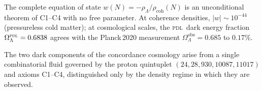 \documentclass[12pt,a4paper]{article}
\newcommand{\PDL}{\textsc{pdl}}
\newcommand{\rhocoh}{\rho_{\mathrm{coh}}}
\newcommand{\rhoLambda}{\rho_\Lambda}
\newcommand{\quintuplet}{(24,28,930,10087,11017)}
\newcommand{\OmegaL}{\Omega_\Lambda}
\begin{document}
The complete equation of state $w(N) = -\rhoLambda/\rhocoh(N)$ is an unconditional theorem of C1--C4 with no free parameter. At coherence densities, $|w| \sim 10^{-44}$ (pressureless cold matter); at cosmological scales, the \PDL\ dark energy fraction $\OmegaL^{\PDL} = 0.6838$ agrees with the Planck\,2020 measurement $\OmegaL^{\mathrm{obs}} = 0.685$ to $0.17\%$.

The two dark components of the concordance cosmology arise from a single combinatorial fluid governed by the proton quintuplet $\quintuplet$ and axioms C1--C4, distinguished only by the density regime in which they are observed.

\clearpage



\end{document}
